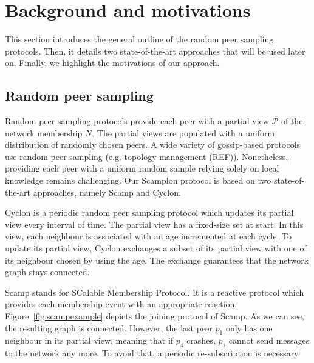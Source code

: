 
\section{Background and motivations}
\label{sec:background}

This section introduces the general outline of the random peer sampling
protocols. Then, it details two state-of-the-art approaches that will be used
later on. Finally, we highlight the motivations of our approach.

\subsection{Random peer sampling}
Random peer sampling protocols provide each peer with a partial view
$\mathcal{P}$ of the network membership $N$. The partial views are populated
with a uniform distribution of randomly chosen peers. A wide variety of
gossip-based protocols use random peer sampling (e.g. topology management
(REF)). Nonetheless, providing each peer with a uniform random sample relying
solely on local knowledge remains challenging.  Our Scamplon protocol is based
on two state-of-the-art approaches, namely Scamp and Cyclon.

\begin{asparadesc}
\item [Cyclon] is a periodic random peer sampling protocol which updates its
  partial view every interval of time. The partial view has a fixed-size set at
  start. In this view, each neighbour is associated with an age incremented at
  each cycle. To update its partial view, Cyclon exchanges a subset of its
  partial view with one of its neighbour chosen by using the age. The exchange
  guarantees that the network graph stays connected.
\end{asparadesc}

\begin{asparadesc}
\item [Scamp] stands for SCalable Membership Protocol. It is a reactive
  protocol which provides each membership event with an appropriate reaction.
  Figure~\ref{fig:scampexample} depicts the joining protocol of Scamp. As we
  can see, the resulting graph is connected. However, the last peer $p_1$ only
  has one neighbour in its partial view, meaning that if $p_4$ crashes, $p_1$
  cannot send messages to the network any more. To avoid that, a periodic
  re-subscription is necessary.
\end{asparadesc}

